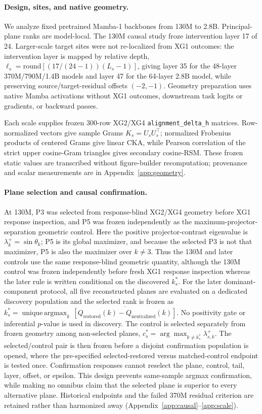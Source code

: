 \documentclass{article}
\begin{document}
\paragraph{Design, sites, and native geometry.}
We analyze fixed pretrained Mamba-1 backbones from 130M to 2.8B. Principal-plane ranks are model-local. The 130M causal study froze intervention layer 17 of 24. Larger-scale target sites were not re-localized from XG1 outcomes: the intervention layer is mapped by relative depth,
$\ell_s=\mathrm{round}[(17/(24-1))(L_s-1)]$,
giving layer 35 for the 48-layer 370M/790M/1.4B models and layer 47 for the 64-layer 2.8B model, while preserving source/target-residual offsets $(-2,-1)$. Geometry preparation uses native Mamba activations without XG1 outcomes, downstream task logits or gradients, or backward passes.

Each scale supplies frozen 300-row XG2/XG4 \texttt{alignment\_delta\_h} matrices. Row-normalized vectors give sample Grams $K_s=U_sU_s^\top$; normalized Frobenius products of centered Grams give linear CKA, while Pearson correlation of the strict upper cosine-Gram triangles gives secondary cosine-RSM. These frozen static values are transcribed without figure-builder recomputation; provenance and scalar measurements are in Appendix~\ref{app:geometry}.

\paragraph{Plane selection and causal confirmation.}
At 130M, P3 was selected from response-blind XG2/XG4 geometry before XG1 response inspection, and P5 was frozen independently as the maximum-projector-separation geometric control. Here the positive projector-contrast eigenvalue is $\lambda_k^{+}=\sin\theta_k$; P5 is its global maximizer, and because the selected P3 is not that maximizer, P5 is also the maximizer over $k\neq3$. Thus the 130M and later controls use the same response-blind geometric quantity, although the 130M control was frozen independently before fresh XG1 response inspection whereas the later rule is written conditional on the discovered $k_s^*$. For the later dominant-component protocol, all five reconstructed planes are evaluated on a dedicated discovery population and the selected rank is frozen as
$k_s^*=\operatorname{unique\,argmax}_k\,\overline{[Q_{\mathrm{restored}}(k)-Q_{\mathrm{neutralized}}(k)]}$.
No positivity gate or inferential $p$-value is used in discovery. The control is selected separately from frozen geometry among non-selected planes,
$c_s^*=\arg\max_{k\neq k_s^*}\lambda_{s,k}^{+}$.
The selected/control pair is then frozen before a disjoint confirmation population is opened, where the pre-specified selected-restored versus matched-control endpoint is tested once. Confirmation responses cannot reselect the plane, control, tail, layer, offset, or epsilon. This design prevents same-sample argmax confirmation, while making no omnibus claim that the selected plane is superior to every alternative plane. Historical endpoints and the failed 370M residual criterion are retained rather than harmonized away (Appendix~\ref{app:causal}--\ref{app:scale}).
\end{document}
